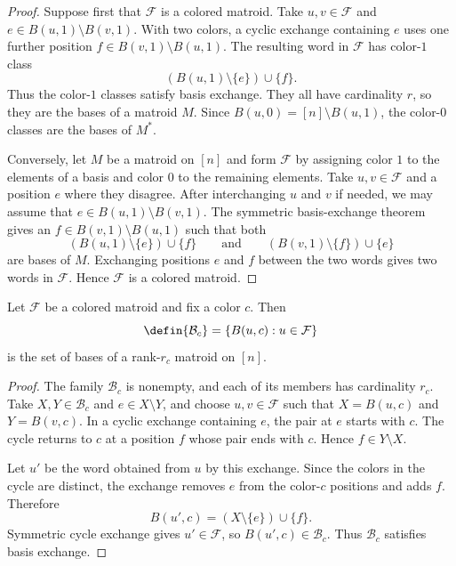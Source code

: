 \begin{proof}
Suppose first that $\mathcal F$ is a colored matroid. Take
$u,v\in\mathcal F$ and $e\in B(u,1)\setminus B(v,1)$. With two colors, a
cyclic exchange containing $e$ uses one further position
$f\in B(v,1)\setminus B(u,1)$. The resulting word in $\mathcal F$ has
color-$1$ class
\[
 (B(u,1)\setminus\{e\})\cup\{f\}.
\]
Thus the color-$1$ classes satisfy basis exchange. They all have cardinality
$r$, so they are the bases of a matroid $M$. Since
$B(u,0)=[n]\setminus B(u,1)$, the color-$0$ classes are the bases of $M^*$.

Conversely, let $M$ be a matroid on $[n]$ and form $\mathcal F$ by assigning
color $1$ to the elements of a basis and color $0$ to the remaining elements.
Take $u,v\in\mathcal F$ and a position $e$ where they disagree. After
interchanging $u$ and $v$ if needed, we may assume that
$e\in B(u,1)\setminus B(v,1)$. The symmetric basis-exchange theorem gives an
$f\in B(v,1)\setminus B(u,1)$ such that both
\[
 (B(u,1)\setminus\{e\})\cup\{f\}
 \qquad\text{and}\qquad
 (B(v,1)\setminus\{f\})\cup\{e\}
\]
are bases of $M$. Exchanging positions $e$ and $f$ between the two words gives
two words in $\mathcal F$. Hence $\mathcal F$ is a colored matroid.
\end{proof}

\begin{proposition}
Let $\mathcal F$ be a colored matroid and fix a color $c$. Then
\[
 \defin{\mathcal B_c}=\{B(u,c):u\in\mathcal F\}
\]
is the set of bases of a rank-$r_c$ matroid on $[n]$.
\end{proposition}

\begin{proof}
The family $\mathcal B_c$ is nonempty, and each of its members has cardinality
$r_c$. Take $X,Y\in\mathcal B_c$ and $e\in X\setminus Y$, and choose
$u,v\in\mathcal F$ such that $X=B(u,c)$ and $Y=B(v,c)$. In a cyclic exchange
containing $e$, the pair at $e$ starts with $c$. The cycle returns to $c$ at a
position $f$ whose pair ends with $c$. Hence $f\in Y\setminus X$.

Let $u'$ be the word obtained from $u$ by this exchange. Since the colors in
the cycle are distinct, the exchange removes $e$ from the color-$c$ positions
and adds $f$. Therefore
\[
 B(u',c)=(X\setminus\{e\})\cup\{f\}.
\]
Symmetric cycle exchange gives $u'\in\mathcal F$, so
$B(u',c)\in\mathcal B_c$. Thus $\mathcal B_c$ satisfies basis exchange.
\end{proof}


